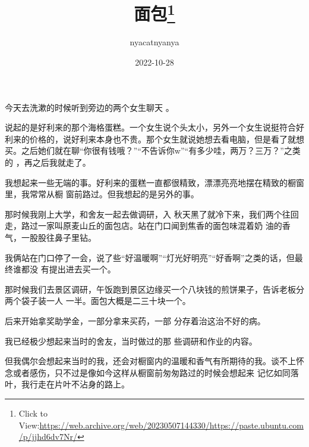\documentclass{article}
\title{面包\footnote{Click to View:\url{https://web.archive.org/web/20230507144330/https://paste.ubuntu.com/p/jjhd6dv7Nr/}}}
\author{nyacatnyanya}
\date{2022-10-28}
\begin{document}

\maketitle


\Large

﻿今天去洗漱的时候听到旁边的两个女生聊天
。 

说起的是好利来的那个海格蛋糕。一个女生说个头太小，另外一个女生说挺符合好利来的价格的，说好利来本身也不贵。那个女生就说她想去看电脑，但是看了就想买。之后她们就在聊“你很有钱哦？”“不告诉你w”“有多少哇，两万？三万？”之类的
，再之后我就走了。 

我想起来一些无端的事。好利来的蛋糕一直都很精致，漂漂亮亮地摆在精致的橱窗里，我常常从橱
窗前路过。但我想起的是另外的事。 

那时候我刚上大学，和舍友一起去做调研，入
\newpage
秋天黑了就冷下来，我们两个往回走，路过一家叫原麦山丘的面包店。站在门口闻到焦香的面包味混着奶
油的香气，一股股往鼻子里钻。 

我俩站在门口停了一会，说了些“好温暖啊”“灯光好明亮”“好香啊”之类的话，但最终谁都没
有提出进去买一个。 

那时候我们去景区调研，午饭跑到景区边缘买一个八块钱的煎饼果子，告诉老板分两个袋子装一人
一半。面包大概是二三十块一个。 

后来开始拿奖助学金，一部分拿来买药，一部
分存着治这治不好的病。 

我已经极少想起来当时的舍友，当时做过的那
些调研和作业的内容。 

但我偶尔会想起来当时的我，还会对橱窗内的温暖和香气有所期待的我。谈不上怀念或者感伤，只不过是像如今这样从橱窗前匆匆路过的时候会想起来
\newpage
记忆如同落叶，我行走在片叶不沾身的路上。
\end{document}
